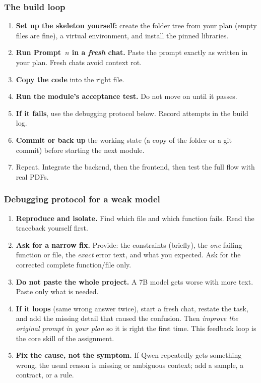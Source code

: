 \documentclass[11pt,a4paper]{article}
\begin{document}
\subsubsection{The build loop}
\begin{enumerate}
\item \textbf{Set up the skeleton yourself:} create the folder tree from your plan (empty files are fine), a virtual environment, and install the pinned libraries.
\item \textbf{Run Prompt~$n$ in a \emph{fresh} chat.} Paste the prompt exactly as written in your plan. Fresh chats avoid context rot.
\item \textbf{Copy the code} into the right file.
\item \textbf{Run the module's acceptance test.} Do not move on until it passes.
\item \textbf{If it fails}, use the debugging protocol below. Record attempts in the build log.
\item \textbf{Commit or back up} the working state (a copy of the folder or a git commit) before starting the next module.
\item Repeat. Integrate the backend, then the frontend, then test the full flow with real PDFs.
\end{enumerate}

\subsubsection{Debugging protocol for a weak model}
\begin{enumerate}
\item \textbf{Reproduce and isolate.} Find which file and which function fails. Read the traceback yourself first.
\item \textbf{Ask for a narrow fix.} Provide: the constraints (briefly), the \emph{one} failing function or file, the \emph{exact} error text, and what you expected. Ask for the corrected complete function/file only.
\item \textbf{Do not paste the whole project.} A 7B model gets worse with more text. Paste only what is needed.
\item \textbf{If it loops} (same wrong answer twice), start a fresh chat, restate the task, and add the missing detail that caused the confusion. Then \emph{improve the original prompt in your plan} so it is right the first time. This feedback loop is the core skill of the assignment.
\item \textbf{Fix the cause, not the symptom.} If Qwen repeatedly gets something wrong, the usual reason is missing or ambiguous context; add a sample, a contract, or a rule.
\end{enumerate}
\end{document}
